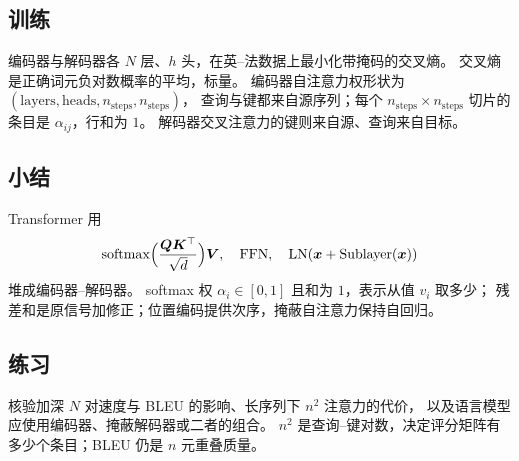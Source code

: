 \subsection{训练}

编码器与解码器各 $N$ 层、$h$ 头，在英--法数据上最小化带掩码的交叉熵。
交叉熵是正确词元负对数概率的平均，标量。
编码器自注意力权形状为
$(\text{layers},\text{heads},n_{\text{steps}},n_{\text{steps}})$，
查询与键都来自源序列；每个 $n_{\text{steps}}\times n_{\text{steps}}$ 切片的条目是 $\alpha_{ij}$，行和为 $1$。
解码器交叉注意力的键则来自源、查询来自目标。

\subsection{小结}

Transformer 用
\[
\operatorname{softmax}\Bigl(\frac{\bm{Q}\bm{K}^{\top}}{\sqrt{d}}\Bigr)\bm{V},
\quad
\operatorname{FFN},
\quad
\operatorname{LN}(\bm{x}+\operatorname{Sublayer}(\bm{x}))
\]
堆成编码器--解码器。
softmax 权 $\alpha_i\in[0,1]$ 且和为 $1$，表示从值 $v_i$ 取多少；
残差和是原信号加修正；位置编码提供次序，掩蔽自注意力保持自回归。

\subsection{练习}

核验加深 $N$ 对速度与 BLEU 的影响、长序列下 $n^{2}$ 注意力的代价，
以及语言模型应使用编码器、掩蔽解码器或二者的组合。
$n^{2}$ 是查询--键对数，决定评分矩阵有多少个条目；BLEU 仍是 $n$ 元重叠质量。
